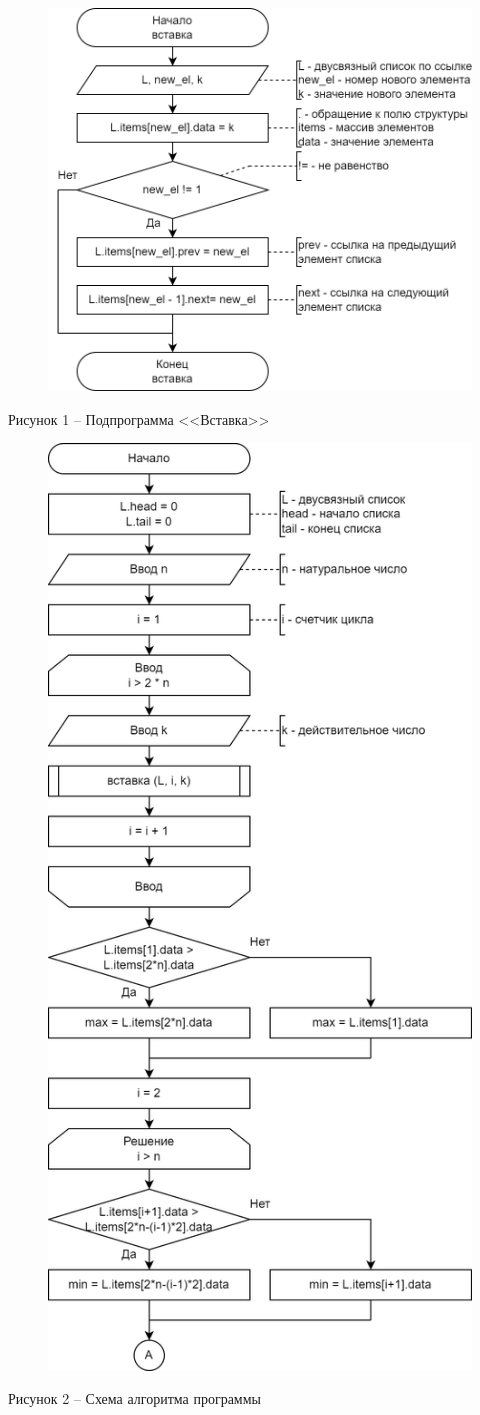 \documentclass[a4paper,14pt]{extarticle}
\begin{document}
	\begin{figure}[h]
		\centering
		\includegraphics[width=0.56\linewidth]{images/s-1}
	\end{figure}
	\begin{center}
		Рисунок 1 – Подпрограмма <<Вставка>>
	\end{center}
	
	\pagebreak
	\begin{figure}[h]
		\centering
		\includegraphics[width=0.538\linewidth]{images/s-2}
	\end{figure}
	\begin{center}
		Рисунок 2 – Схема алгоритма программы
	\end{center}
	
\end{document}
